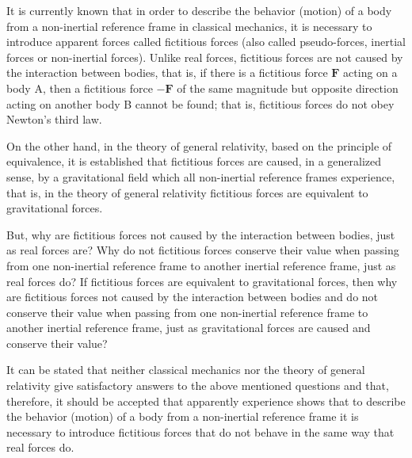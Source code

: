 \documentclass[12pt]{article}
\newcommand{\yN}{\newpage}%
\newcommand{\vF}{\mathbf{F}}
\begin{document}
\par It is currently known that in order to describe the behavior (motion) of a body from a non-inertial reference frame in classical mechanics, it is necessary to introduce apparent forces called fictitious forces (also called pseudo-forces, inertial forces or non-inertial forces). Unlike real forces, fictitious forces are not caused by the interaction between bodies, that is, if there is a fictitious force $\vF$ acting on a body A, then a fictitious force $-\vF$ of the same magnitude but opposite direction acting on another body B cannot be found; that is, fictitious forces do not obey Newton's third law.
\par On the other hand, in the theory of general relativity, based on the principle of equivalence, it is established that fictitious forces are caused, in a generalized sense, by a gravitational field which all non-inertial reference frames experience, that is, in the theory of general relativity fictitious forces are equivalent to gravitational forces.
\par But, why are fictitious forces not caused by the interaction between bodies, just as real forces are? Why do not fictitious forces conserve their value when passing from one non-inertial reference frame to another inertial reference frame, just as real forces do? If fictitious forces are equivalent to gravitational forces, then why are fictitious forces not caused by the interaction between bodies and do not conserve their value when passing from one non-inertial reference frame to another inertial reference frame, just as gravitational forces are caused and conserve their value?
\par It can be stated that neither classical mechanics nor the theory of general relativity give satisfactory answers to the above mentioned questions and that, therefore, it should be accepted that apparently experience shows that to describe the behavior (motion) of a body from a non-inertial reference frame it is necessary to introduce fictitious forces that do not behave in the same way that real forces do.

\yN \baselineskip=14.5pt \enlargethispage{+0.3em}
\end{document}

